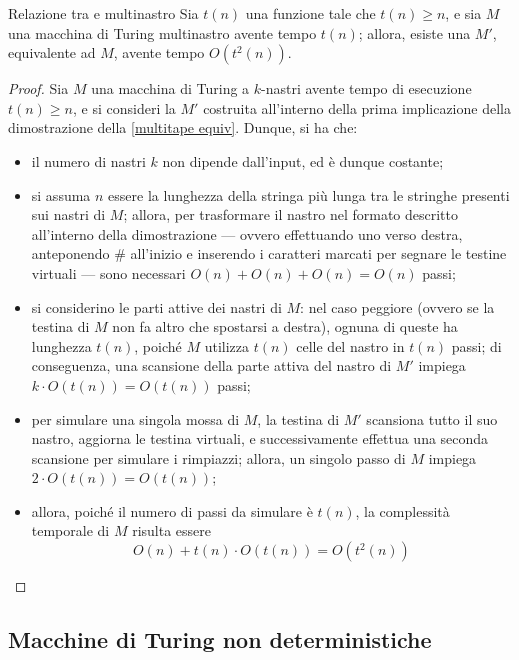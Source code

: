 \documentclass[a4paper, 12pt]{report}
\begin{document}
    \begin{framedthm}{Relazione tra \TM e \TM multinastro}
        Sia $t(n)$ una funzione tale che $t(n) \ge n$, e sia $M$ una macchina di Turing multinastro avente tempo $t(n)$; allora, esiste una \TM $M'$, equivalente ad $M$, avente tempo $O(t^2(n))$.
    \end{framedthm}

    \begin{proof}
        Sia $M$ una macchina di Turing a $k$-nastri avente tempo di esecuzione $t(n) \ge n$, e si consideri la \TM $M'$ costruita all'interno della prima implicazione della dimostrazione della \cref{multitape equiv}. Dunque, si ha che:

        \begin{itemize}
            \item il numero di nastri $k$ non dipende dall'input, ed è dunque costante;
            \item si assuma $n$ essere la lunghezza della stringa più lunga tra le stringhe presenti sui nastri di $M$; allora, per trasformare il nastro nel formato descritto all'interno della dimostrazione --- ovvero effettuando uno  verso destra, anteponendo \ttt \# all'inizio e inserendo i caratteri marcati per segnare le testine virtuali --- sono necessari $O(n) + O(n) + O(n) = O(n)$ passi;
            \item si considerino le parti attive dei nastri di $M$: nel caso peggiore (ovvero se la testina di $M$ non fa altro che spostarsi a destra), ognuna di queste ha lunghezza $t(n)$, poiché $M$ utilizza $t(n)$ celle del nastro in $t(n)$ passi; di conseguenza, una scansione della parte attiva del nastro di $M'$ impiega $k \cdot O(t(n))= O(t(n))$ passi;
            \item per simulare una singola mossa di $M$, la testina di $M'$ scansiona tutto il suo nastro, aggiorna le testina virtuali, e successivamente effettua una seconda scansione per simulare i rimpiazzi; allora, un singolo passo di $M$ impiega $2 \cdot O(t(n)) = O(t(n))$;
            \item allora, poiché il numero di passi da simulare è $t(n)$, la complessità temporale di $M$ risulta essere $$O(n) + t(n) \cdot O(t(n)) = O(t^2(n))$$
        \end{itemize}
    \end{proof}

    \subsection{Macchine di Turing non deterministiche}
\end{document}
